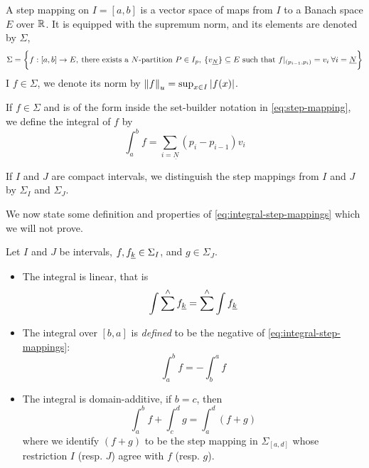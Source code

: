 \documentclass[../main-manifolds.tex]{subfiles}
\begin{document}
\begin{definition}\label{def:step-mapping}
A step mapping on $I = [a,b]$ is a vector space of maps from $I$ to a Banach space $E$ over $\mathbb{R}$. It is equipped with the supremum norm, and its elements are denoted by $\Sigma$,
\begin{equation}\label{eq:step-mapping}
    \Sigma = \bigset{f: [a,b]\to E,\: \text{there exists a $N$-partition }P\in I_p,\:\{\UL{v}[N]\}\subseteq E\text{ such that } f\vert_{(p_{i-1}, p_i)} = v_i\: \forall i = \underline{N}}
\end{equation}
I $f\in \Sigma$, we denote its norm by $\norm{f}_u = \sup_{x\in I}\abs{f(x)}$.
\end{definition}
%
\begin{definition}\label{def:integral-step-mappings}
    If $f\in \Sigma$ and is of the form inside the set-builder notation in \cref{eq:step-mapping}, we define the integral of $f$ by
    \begin{equation}\label{eq:integral-step-mappings}
        \int_a^b f = \sum_{i=\underline{N}}(p_i - p_{i-1})v_i
    \end{equation}
\end{definition}
%
\begin{remark}
If $I$ and $J$ are compact intervals, we distinguish the step mappings from $I$ and $J$ by $\Sigma_I$ and $\Sigma_J$.    
\end{remark}
%
We now state some definition and properties of \cref{eq:integral-step-mappings} which we will not prove. 
\begin{wts}\label{prop:properties-integral-step-mappings}
    Let $I$ and $J$ be intervals, $f,\UL{f}[k]\in \Sigma_I$, and $g\in \Sigma_J$. 
    \begin{itemize}
        \item The integral is linear, that is
        \begin{equation}\label{eq:integral-step-mappings-linear}
            \int \sum^\wedge \UL{f}[k] = \sum^\wedge \int \UL{f}[k]
        \end{equation}
        \item The integral over $[b,a]$ is \emph{defined} to be the negative of \cref{eq:integral-step-mappings}:
        \begin{equation}\label{eq:integral-step-mappings-negative}
            \int_a^b f = - \int_b^a f
        \end{equation}
        \item The integral is domain-additive, if $b=c$, then 
        \begin{equation}\label{eq:integral-step-mappings-domain-additive}
            \int_a^b f + \int_c^d g = \int_a^d (f+g)
        \end{equation}
        where we identify $(f+g)$ to be the step mapping in $\Sigma_{[a,d]}$ whose restriction $I$ (resp. $J$) agree with $f$ (resp. $g$).
    \end{itemize}
\end{wts}
\end{document}
